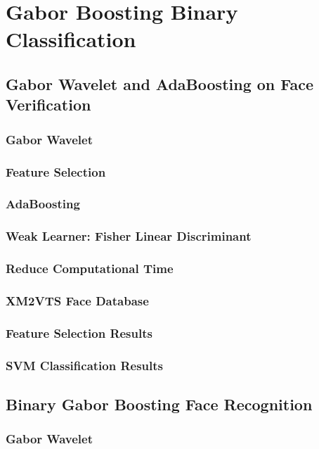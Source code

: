 \chapter{Gabor Boosting Binary Classification}
\label{ch:bin}

\section{Gabor Wavelet and AdaBoosting on Face Verification}
\label{sec:faceveri}
\subsection{Gabor Wavelet}
\label{sec:faceveri:gabor}
\subsection{Feature Selection}
\label{sec:faceveri:selection}
\subsection{AdaBoosting}
\label{sec:faceveri:adaboosting}
\subsection{Weak Learner: Fisher Linear Discriminant}
\label{sec:faceveri:fld}
\subsection{Reduce Computational Time}
\label{sec:faceveri:time}
\subsection{XM2VTS Face Database}
\label{sec:faceveri:xm2vts}
\subsection{Feature Selection Results}
\label{sec:faceveri:result1}
\subsection{SVM Classification Results}
\label{sec:faceveri:result2}

\section{Binary Gabor Boosting Face Recognition}
\subsection{Gabor Wavelet}

